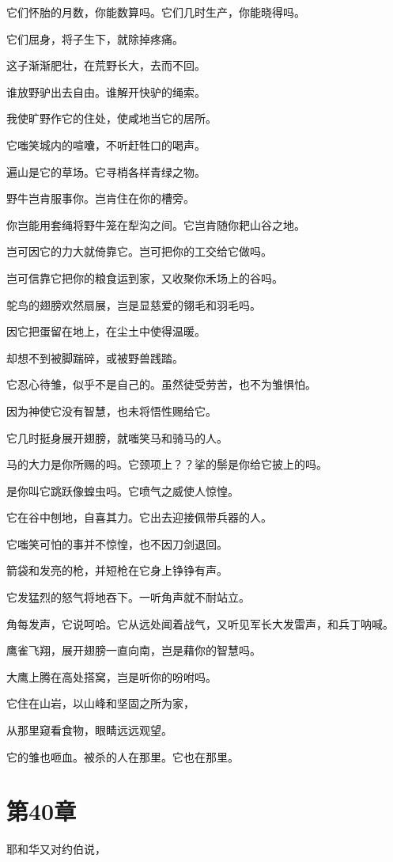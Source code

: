 \documentclass[12pt,oneside]{book}
\begin{document}
它们怀胎的月数，你能数算吗。它们几时生产，你能晓得吗。

它们屈身，将子生下，就除掉疼痛。

这子渐渐肥壮，在荒野长大，去而不回。

谁放野驴出去自由。谁解开快驴的绳索。

我使旷野作它的住处，使咸地当它的居所。

它嗤笑城内的喧囔，不听赶牲口的喝声。

遍山是它的草场。它寻梢各样青绿之物。

野牛岂肯服事你。岂肯住在你的槽旁。

你岂能用套绳将野牛笼在犁沟之间。它岂肯随你耙山谷之地。

岂可因它的力大就倚靠它。岂可把你的工交给它做吗。

岂可信靠它把你的粮食运到家，又收聚你禾场上的谷吗。

鸵鸟的翅膀欢然扇展，岂是显慈爱的翎毛和羽毛吗。

因它把蛋留在地上，在尘土中使得温暖。

却想不到被脚踹碎，或被野兽践踏。

它忍心待雏，似乎不是自己的。虽然徒受劳苦，也不为雏惧怕。

因为神使它没有智慧，也未将悟性赐给它。

它几时挺身展开翅膀，就嗤笑马和骑马的人。

马的大力是你所赐的吗。它颈项上？？挲的鬃是你给它披上的吗。

是你叫它跳跃像蝗虫吗。它喷气之威使人惊惶。

它在谷中刨地，自喜其力。它出去迎接佩带兵器的人。

它嗤笑可怕的事并不惊惶，也不因刀剑退回。

箭袋和发亮的枪，并短枪在它身上铮铮有声。

它发猛烈的怒气将地吞下。一听角声就不耐站立。

角每发声，它说呵哈。它从远处闻着战气，又听见军长大发雷声，和兵丁呐喊。

鹰雀飞翔，展开翅膀一直向南，岂是藉你的智慧吗。

大鹰上腾在高处搭窝，岂是听你的吩咐吗。

它住在山岩，以山峰和坚固之所为家，

从那里窥看食物，眼睛远远观望。

它的雏也咂血。被杀的人在那里。它也在那里。


\chapter{第40章}
耶和华又对约伯说，
\end{document}
